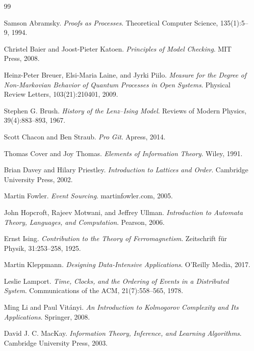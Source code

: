 \documentclass[12pt]{article}
\begin{document}
\newpage


\begin{thebibliography}{99}

Samson Abramsky.
\textit{Proofs as Processes}.
Theoretical Computer Science, 135(1):5--9, 1994.

Christel Baier and Joost-Pieter Katoen.
\textit{Principles of Model Checking}.
MIT Press, 2008.

Heinz-Peter Breuer, Elsi-Maria Laine, and Jyrki Piilo.
\textit{Measure for the Degree of Non-Markovian Behavior of Quantum Processes in Open Systems}.
Physical Review Letters, 103(21):210401, 2009.

Stephen G. Brush.
\textit{History of the Lenz--Ising Model}.
Reviews of Modern Physics, 39(4):883--893, 1967.

Scott Chacon and Ben Straub.
\textit{Pro Git}.
Apress, 2014.

Thomas Cover and Joy Thomas.
\textit{Elements of Information Theory}.
Wiley, 1991.

Brian Davey and Hilary Priestley.
\textit{Introduction to Lattices and Order}.
Cambridge University Press, 2002.

Martin Fowler.
\textit{Event Sourcing}.
martinfowler.com, 2005.

John Hopcroft, Rajeev Motwani, and Jeffrey Ullman.
\textit{Introduction to Automata Theory, Languages, and Computation}.
Pearson, 2006.

Ernst Ising.
\textit{Contribution to the Theory of Ferromagnetism}.
Zeitschrift f\"ur Physik, 31:253--258, 1925.

Martin Kleppmann.
\textit{Designing Data-Intensive Applications}.
O'Reilly Media, 2017.

Leslie Lamport.
\textit{Time, Clocks, and the Ordering of Events in a Distributed System}.
Communications of the ACM, 21(7):558--565, 1978.

Ming Li and Paul Vit\'anyi.
\textit{An Introduction to Kolmogorov Complexity and Its Applications}.
Springer, 2008.

David J. C. MacKay.
\textit{Information Theory, Inference, and Learning Algorithms}.
Cambridge University Press, 2003.


\end{thebibliography}
\end{document}
